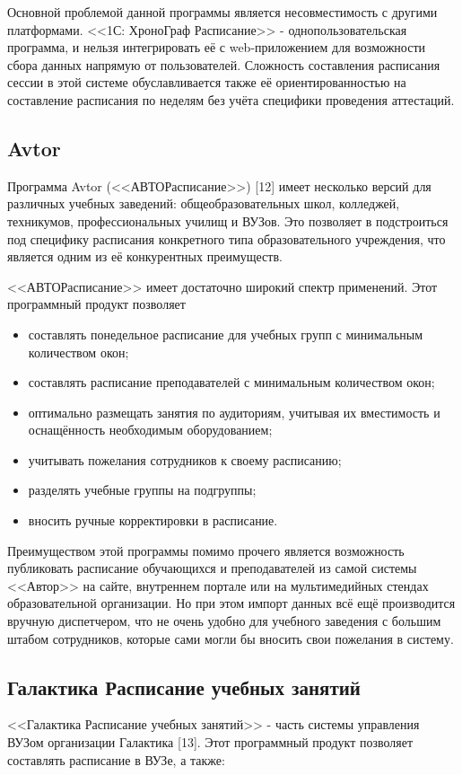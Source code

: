 Основной проблемой данной программы является несовместимость с другими платформами. <<1С: ХроноГраф Расписание>> - однопользовательская программа, и нельзя интегрировать её с web-приложением для возможности сбора данных напрямую от пользователей. Сложность составления расписания сессии в этой системе обуславливается также её ориентированностью на составление расписания по неделям без учёта специфики проведения аттестаций.

\subsection{Avtor}%
Программа Avtor (<<АВТОРасписание>>) [12] имеет несколько версий для различных учебных заведений: общеобразовательных школ, колледжей, техникумов, профессиональных училищ и ВУЗов. Это позволяет в подстроиться под специфику расписания конкретного типа образовательного учреждения, что является одним из её конкурентных преимуществ.

<<АВТОРасписание>> имеет достаточно широкий спектр применений. Этот программный продукт позволяет
\begin{itemize}
	\item составлять понедельное расписание для учебных групп с минимальным количеством окон;
	\item составлять расписание преподавателей с минимальным количеством окон;
	\item оптимально размещать занятия по аудиториям, учитывая их вместимость и оснащённость необходимым оборудованием;
	\item учитывать пожелания сотрудников к своему расписанию;
	\item разделять учебные группы на подгруппы;
	\item вносить ручные корректировки в расписание.
\end{itemize}

Преимуществом этой программы помимо прочего является возможность публиковать расписание обучающихся и преподавателей из самой системы <<Автор>> на сайте, внутреннем портале или на мультимедийных стендах образовательной организации. Но при этом импорт данных всё ещё производится вручную диспетчером, что не очень удобно для учебного заведения с большим штабом сотрудников, которые сами могли бы вносить свои пожелания в систему.

\subsection{Галактика Расписание учебных занятий}
<<Галактика Расписание учебных занятий>> - часть системы управления ВУЗом организации Галактика [13]. Этот программный продукт позволяет составлять расписание в ВУЗе, а также:

